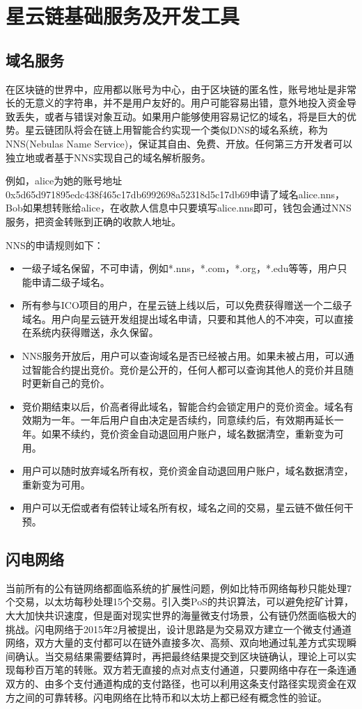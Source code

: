 \section{星云链基础服务及开发工具}
\subsection{域名服务}

在区块链的世界中，应用都以账号为中心，由于区块链的匿名性，账号地址是非常长的无意义的字符串，并不是用户友好的。用户可能容易出错，意外地投入资金导致丢失，或者与错误对象互动。如果用户能够使用容易记忆的域名，将是巨大的优势。星云链团队将会在链上用智能合约实现一个类似DNS的域名系统，称为NNS(Nebulas Name Service)，保证其自由、免费、开放。任何第三方开发者可以独立地或者基于NNS实现自己的域名解析服务。

例如，alice为她的账号地址0x5d65d971895edc438f465c17db6992698a52318d5c17db69申请了域名alice.nns，Bob如果想转账给alice，在收款人信息中只要填写alice.nns即可，钱包会通过NNS服务，把资金转账到正确的收款人地址。

NNS的申请规则如下：
\begin{itemize}
	\item 一级子域名保留，不可申请，例如*.nns，*.com，*.org，*.edu等等，用户只能申请二级子域名。
	\item 所有参与ICO项目的用户，在星云链上线以后，可以免费获得赠送一个二级子域名。用户向星云链开发组提出域名申请，只要和其他人的不冲突，可以直接在系统内获得赠送，永久保留。
	\item NNS服务开放后，用户可以查询域名是否已经被占用。如果未被占用，可以通过智能合约提出竞价。竞价是公开的，任何人都可以查询其他人的竞价并且随时更新自己的竞价。
	\item 竞价期结束以后，价高者得此域名，智能合约会锁定用户的竞价资金。域名有效期为一年。一年后用户自由决定是否续约，同意续约后，有效期再延长一年。如果不续约，竞价资金自动退回用户账户，域名数据清空，重新变为可用。
	\item 用户可以随时放弃域名所有权，竞价资金自动退回用户账户，域名数据清空，重新变为可用。
	\item 用户可以无偿或者有偿转让域名所有权，域名之间的交易，星云链不做任何干预。
\end{itemize}


\subsection{闪电网络}
当前所有的公有链网络都面临系统的扩展性问题，例如比特币网络每秒只能处理7个交易，以太坊每秒处理15个交易。引入类PoS的共识算法，可以避免挖矿计算，大大加快共识速度，但是面对现实世界的海量微支付场景，公有链仍然面临极大的挑战。闪电网络\cite{poon2015bitcoin}于2015年2月被提出，设计思路是为交易双方建立一个微支付通道网络，双方大量的支付都可以在链外直接多次、高频、双向地通过轧差方式实现瞬间确认。当交易结果需要结算时，再把最终结果提交到区块链确认，理论上可以实现每秒百万笔的转账。双方若无直接的点对点支付通道，只要网络中存在一条连通双方的、由多个支付通道构成的支付路径，也可以利用这条支付路径实现资金在双方之间的可靠转移。闪电网络在比特币和以太坊上都已经有概念性的验证。

